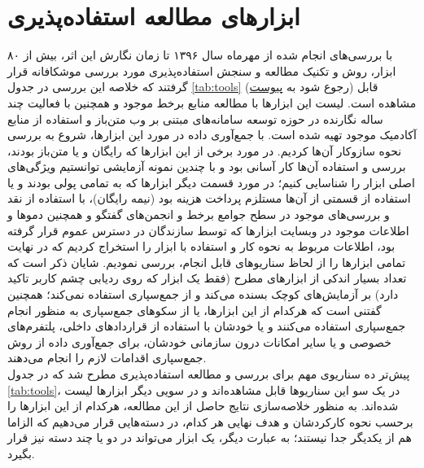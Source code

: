 \section{ابزارهای مطالعه استفاده‌پذیری}
با بررسی‌های انجام شده از مهرماه سال ۱۳۹۶ تا زمان نگارش این اثر، بیش از ۸۰ ابزار، روش و تکنیک مطالعه و سنجش استفاده‌پذیری مورد بررسی موشکافانه قرار گرفتند که خلاصه این بررسی در جدول
\ref{tab:tools}
(رجوع شود به
\hyperref[sec:appendix]{پیوست})
قابل مشاهده است. لیست این ابزارها با مطالعه منابع برخط موجود و همچنین با فعالیت چند ساله نگارنده در حوزه توسعه سامانه‌های مبتنی بر وب متن‌باز و استفاده از منابع آکادمیک موجود تهیه شده است. با جمع‌آوری داده در مورد این ابزارها، شروع به بررسی نحوه سازوکار آن‌ها کردیم. در مورد برخی از این ابزارها که رایگان و یا متن‌باز بودند، بررسی و استفاده آن‌ها کار آسانی بود و با چندین نمونه آزمایشی توانستیم ویژگی‌های اصلی ابزار را شناسایی کنیم؛ در مورد قسمت دیگر ابزارها که به تمامی پولی بودند و یا استفاده از قسمتی از آن‌ها مستلزم پرداخت هزینه بود (نیمه رایگان)،
با استفاده از نقد و بررسی‌های موجود در سطح جوامع برخط و انجمن‌های گفتگو و همچنین دموها و اطلاعات موجود در وبسایت ابزارها که توسط سازندگان در دسترس عموم قرار گرفته بود، اطلاعات مربوط به نحوه کار و استفاده با ابزار را استخراج کردیم که در نهایت تمامی ابزارها را از لحاظ سناریوهای قابل انجام، بررسی نمودیم. شایان ذکر است که تعداد بسیار اندکی از ابزارهای مطرح (فقط یک ابزار که روی ردیابی چشم کاربر تاکید دارد) بر آزمایش‌های کوچک بسنده می‌کند و از جمع‌سپاری استفاده نمی‌کند؛ همچنین گفتنی است که هرکدام از این ابزارها، یا از سکوهای جمع‌سپاری به منظور انجام جمع‌سپاری استفاده می‌کنند و یا خودشان با استفاده از قراردادهای داخلی، پلتفرم‌های خصوصی و یا سایر امکانات درون سازمانی خودشان، برای جمع‌آوری داده از روش جمع‌سپاری اقدامات لازم را انجام می‌دهند.\\
پیش‌تر ده سناریوی مهم برای بررسی و مطالعه استفاده‌پذیری مطرح شد که در جدول
\ref{tab:tools}،
در یک سو این سناریوها قابل مشاهده‌اند و در سویی دیگر ابزارها لیست شده‌اند. به منظور خلاصه‌سازی نتایج حاصل از این مطالعه، هرکدام از این ابزارها را برحسب نحوه کارکردشان و هدف نهایی هر کدام، در دسته‌هایی قرار می‌دهیم که الزاما هم از یکدیگر جدا نیستند؛ به عبارت دیگر، یک ابزار می‌تواند در دو یا چند دسته نیز قرار بگیرد.\\

